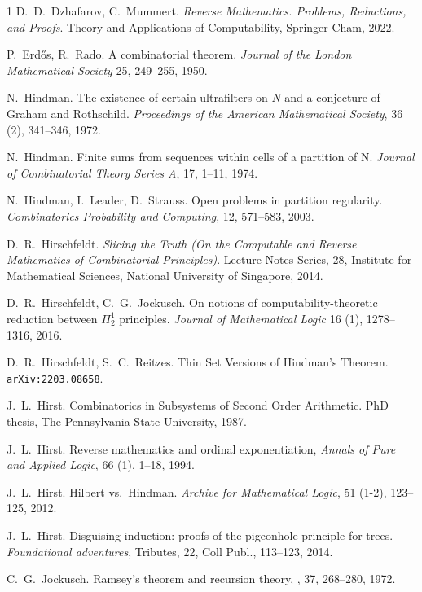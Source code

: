 \documentclass[a4paper,11pt]{article}
\begin{document}
\begin{thebibliography}{1}
D.~D.~Dzhafarov, C.~Mummert.
{\em Reverse Mathematics. Problems, Reductions, and Proofs}.
Theory and Applications of Computability, Springer Cham, 2022.


P.~Erd\H{o}s, R.~Rado.
A combinatorial theorem.
{\em Journal of the London Mathematical Society} 25, 249--255, 1950.

N.~Hindman. 
The existence of certain ultrafilters on $N$ and a conjecture of Graham and Rothschild.
{\em Proceedings of the American Mathematical Society}, 36 (2), 341--346, 1972.

N.~Hindman. 
Finite sums from sequences within cells of a partition of N.
{\em Journal of Combinatorial Theory Series A}, 17, 1--11, 1974.

N.~Hindman, I.~Leader, D.~Strauss. 
Open problems in partition regularity.
{\em Combinatorics Probability and Computing}, 12, 571--583, 2003.

D.~R.~Hirschfeldt.
{\em Slicing the Truth (On the Computable and Reverse Mathematics of Combinatorial Principles)}. 
Lecture Notes Series, 28, Institute for Mathematical Sciences, National University of Singapore, 2014. 

D.~R.~Hirschfeldt, C.~G.~Jockusch.
On notions of computability-theoretic reduction between $\Pi^1_2$ principles. 
{\em Journal of Mathematical Logic} 16 (1), 1278--1316, 2016.

D.~R.~Hirschfeldt, S.~C.~Reitzes.
Thin Set Versions of Hindman's Theorem.
{\tt 	arXiv:2203.08658}.

J.~L.~Hirst.
Combinatorics in Subsystems of Second Order Arithmetic.
PhD thesis, The Pennsylvania State University, 1987.

J.~L.~Hirst.
Reverse mathematics and ordinal exponentiation,
{\em Annals of Pure and Applied Logic}, 66 (1), 1--18, 1994.

J.~L.~Hirst.
Hilbert vs.~Hindman. 
{\em Archive for Mathematical Logic}, 51 (1-2), 123--125, 2012. 

J.~L.~Hirst. 
Disguising induction: proofs of the pigeonhole principle for trees.
{\em Foundational adventures}, Tributes, 22, Coll Publ., 113--123, 2014.


\newblock C.~G.~Jockusch.
\newblock Ramsey's theorem and recursion theory, 
, 37, 268--280, 1972.


\end{thebibliography}
\end{document}
